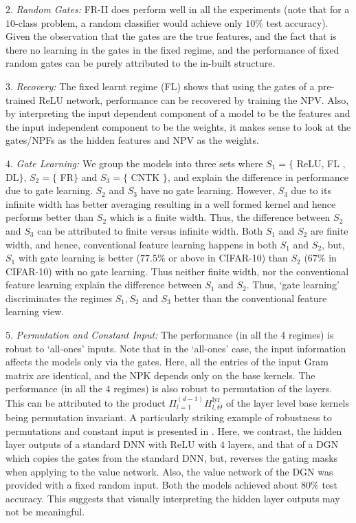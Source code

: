\indent\quad $2.$ \emph{Random Gates:} FR-II does perform well in all the experiments (note that for a $10$-class problem, a random classifier would achieve only $10\%$ test accuracy). Given the observation that the gates are the true features, and the fact that is there no learning in the gates in the fixed regime, and the performance of fixed random gates can be purely attributed to the in-built structure.

\indent\quad $3.$ \emph{Recovery:} The fixed learnt regime  (FL) shows that using the gates of a pre-trained ReLU network, performance can be recovered by training the NPV. Also, by interpreting the input dependent component of a model to be the features and the input independent component to be the weights, it makes sense to look at the gates/NPFs as the hidden features and NPV as the weights.%

\indent\quad $4.$ \emph{Gate Learning:} We group the models into three sets where $S_1=\{$ ReLU, FL , DL$\}$, $S_2=\{$ FR$\}$ and $S_3=\{$ CNTK $\}$, and explain the difference in performance due to gate learning.
 $S_2$ and $S_3$ have no gate learning. However,  $S_3$ due to its infinite width has better averaging resulting in a well formed kernel and hence performs better than $S_2$ which is a finite width. Thus, the difference between $S_2$ and $S_3$ can be attributed to finite versus infinite width. Both $S_1$ and $S_2$ are finite width, and hence, conventional feature learning happens in both $S_1$ and $S_2$, but, $S_1$ with gate learning is better ($77.5\%$ or above in CIFAR-10) than $S_2$ ($67\%$ in CIFAR-10) with no gate learning. Thus neither finite width, nor the conventional feature learning explain the difference between $S_1$ and $S_2$. Thus, `gate learning' discriminates the regimes $S_1, S_2$ and $S_3$ better than the conventional feature learning view.

\indent\quad $5.$ \emph{Permutation and Constant Input:} The performance (in all the $4$ regimes) is  robust to `all-ones' inputs. Note that in the `all-ones' case, the input information affects the models only via the gates. Here, all the entries of the input Gram matrix are identical, and the NPK depends only on the base kernels. The performance (in all the $4$ regimes) is also robust to permutation of the layers. This can be attributed to the product $\Pi_{l=1}^{(d-1)} H^{\text{lyr}}_{l,\Theta}$ of the layer level base kernels being permutation invariant. A particularly striking example of robustness to permutations and constant input is presented in . Here,  we contrast, the hidden layer outputs of a standard DNN with ReLU with $4$ layers, and that of a DGN which copies the gates from the standard DNN, but, reverses the gating masks when applying to the value network. Also, the value network of the DGN was provided with a fixed random input. Both the models achieved about $80\%$ test accuracy.  This suggests that visually interpreting the hidden layer outputs may not be meaningful.


